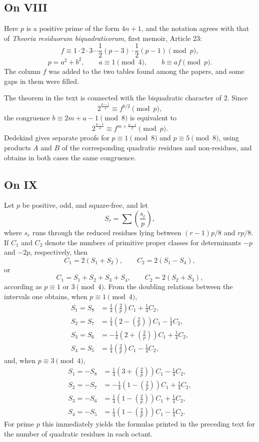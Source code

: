 \documentclass[12pt]{article}
\begin{document}
\subsection*{On VIII}

Here \(p\) is a positive prime of the form \(4n+1\), and the notation agrees with that of \emph{Theoria residuorum biquadraticorum}, first memoir, Article 23:
\[
f\equiv1\cdot2\cdot3\cdots\frac12(p-3)\cdot\frac12(p-1)\pmod p,
\]
\[
p=a^2+b^2,\qquad a\equiv1\pmod4,\qquad b\equiv af\pmod p.
\]
The column \(f\) was added to the two tables found among the papers, and some gaps in them were filled.

The theorem in the text is connected with the biquadratic character of \(2\). Since
\[
2^{\frac{p-1}{4}}\equiv f^{b/2}\pmod p,
\]
the congruence \(b\equiv2m+a-1\pmod8\) is equivalent to
\[
2^{\frac{p-1}{4}}\equiv f^{m+\frac{a-1}{2}}\pmod p.
\]
Dedekind gives separate proofs for \(p\equiv1\pmod8\) and \(p\equiv5\pmod8\), using products \(A\) and \(B\) of the corresponding quadratic residues and non-residues, and obtains in both cases the same congruence.

\subsection*{On IX}

Let \(p\) be positive, odd, and square-free, and let
\[
S_r=\sum\left(\frac{s_r}{p}\right),
\]
where \(s_r\) runs through the reduced residues lying between \((r-1)p/8\) and \(rp/8\). If \(C_1\) and \(C_2\) denote the numbers of primitive proper classes for determinants \(-p\) and \(-2p\), respectively, then
\[
C_1=2(S_1+S_2),\qquad C_2=2(S_1-S_4),
\]
or
\[
C_1=S_1+S_2+S_3+S_4,\qquad C_2=2(S_2+S_3),
\]
according as \(p\equiv1\) or \(3\pmod4\). From the doubling relations between the intervals one obtains, when \(p\equiv1\pmod4\),
\[
\begin{aligned}
S_1=S_8&=\frac14\left(\frac2p\right)C_1+\frac14C_2,\\
S_2=S_7&=\frac14\left(2-\left(\frac2p\right)\right)C_1-\frac14C_2,\\
S_3=S_6&=-\frac14\left(2+\left(\frac2p\right)\right)C_1+\frac14C_2,\\
S_4=S_5&=\frac14\left(\frac2p\right)C_1-\frac14C_2,
\end{aligned}
\]
and, when \(p\equiv3\pmod4\),
\[
\begin{aligned}
S_1=-S_8&=\frac14\left(3+\left(\frac2p\right)\right)C_1-\frac14C_2,\\
S_2=-S_7&=-\frac14\left(1-\left(\frac2p\right)\right)C_1+\frac14C_2,\\
S_3=-S_6&=\frac14\left(1-\left(\frac2p\right)\right)C_1+\frac14C_2,\\
S_4=-S_5&=\frac14\left(1-\left(\frac2p\right)\right)C_1-\frac14C_2.
\end{aligned}
\]
For prime \(p\) this immediately yields the formulas printed in the preceding text for the number of quadratic residues in each octant.
\end{document}
